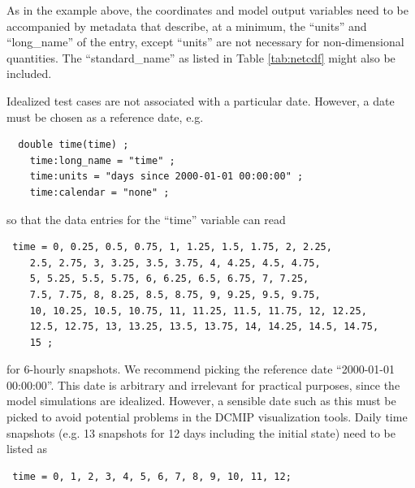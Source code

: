 \documentclass[times,doublespace]{fldauth}
\begin{document}
{\begin{appendix}
As in the example above, the coordinates and model output variables need to be accompanied by metadata that describe, at a minimum, the ``units'' and ``long\_name'' of the entry, except ``units'' are not necessary for non-dimensional quantities. The ``standard\_name'' as listed in Table \ref{tab:netcdf} might also be included.

Idealized test cases are not associated with a particular date. However, a date must be chosen as a reference date, e.g.
\begin{verbatim}
  double time(time) ;
    time:long_name = "time" ;
    time:units = "days since 2000-01-01 00:00:00" ;
    time:calendar = "none" ;
\end{verbatim}
so that the data entries for the ``time'' variable can read
\begin{verbatim}
 time = 0, 0.25, 0.5, 0.75, 1, 1.25, 1.5, 1.75, 2, 2.25,
    2.5, 2.75, 3, 3.25, 3.5, 3.75, 4, 4.25, 4.5, 4.75,
    5, 5.25, 5.5, 5.75, 6, 6.25, 6.5, 6.75, 7, 7.25,
    7.5, 7.75, 8, 8.25, 8.5, 8.75, 9, 9.25, 9.5, 9.75,
    10, 10.25, 10.5, 10.75, 11, 11.25, 11.5, 11.75, 12, 12.25, 
    12.5, 12.75, 13, 13.25, 13.5, 13.75, 14, 14.25, 14.5, 14.75, 
    15 ;
\end{verbatim}
for 6-hourly snapshots. We recommend picking the reference date ``2000-01-01 00:00:00''. This date is arbitrary and irrelevant for practical purposes, since the model simulations are idealized. However, a sensible date such as this must be picked to avoid potential problems in the DCMIP visualization tools.
Daily time snapshots (e.g. 13 snapshots for 12 days including the initial state) need to be listed as
\begin{verbatim}
 time = 0, 1, 2, 3, 4, 5, 6, 7, 8, 9, 10, 11, 12;
\end{verbatim}


\end{appendix}}
\end{document}
